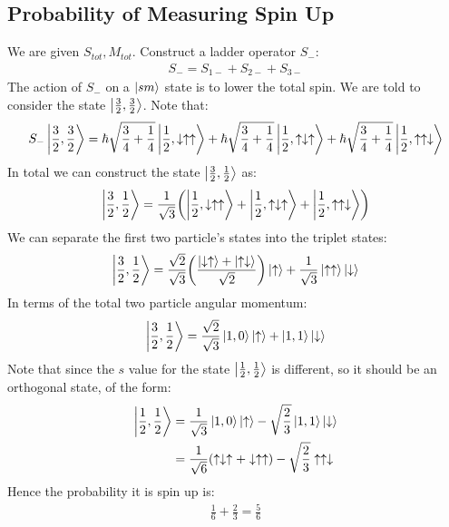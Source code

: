 \documentclass[12pt]{article}
\newcommand{\ua}{\uparrow}
\newcommand{\da}{\downarrow}
\begin{document}
\subsection{Probability of Measuring Spin Up}
We are given $S_{tot},M_{tot}$. Construct a ladder operator $S_-$:
\begin{align*}
  S_-=S_{1-}+S_{2-}+S_{3-}
\end{align*}
The action of $S_-$ on a $\ket{sm}$ state is to lower the total spin. We are told to consider the state $\ket{\frac32,\frac32}$. Note that:
\begin{align*}
  S_{-}\ket{\frac32,\frac32}=
  \hbar\sqrt{\frac34+\frac14}\ket{\frac12,\da\ua\ua}
  +\hbar\sqrt{\frac34+\frac14}\ket{\frac12,\ua\da\ua}
  +\hbar\sqrt{\frac34+\frac14}\ket{\frac12,\ua\ua\da}
\end{align*}
In total we can construct the state $\ket{\frac32,\frac12}$ as:
\begin{align*}
  \ket{\frac32,\frac12}=\frac1{\sqrt{3}}\qty(\ket{\frac12,\da\ua\ua}+
  \ket{\frac12,\ua\da\ua}+\ket{\frac12,\ua\ua\da})
\end{align*}
We can separate the first two particle's states into the triplet states:
\begin{align*}
  \ket{\frac32,\frac12}=\frac{\sqrt{2}}{\sqrt{3}}
  \qty(\frac{\ket{\da\ua}+\ket{\ua\da}}{\sqrt{2}})\ket{\ua}
  +\frac1{\sqrt{3}}\ket{\ua\ua}\ket{\da}
\end{align*}
In terms of the total two particle angular momentum:
\begin{align*}
  \ket{\frac32,\frac12}=\frac{\sqrt{2}}{\sqrt{3}}\ket{1,0}\ket\ua+
  \ket{1,1}\ket{\da}
\end{align*}
Note that since the $s$ value for the state $\ket{\frac12,\frac12}$ is different, so it should be an orthogonal state, of the form:
\begin{align*}
  \ket{\frac12,\frac12}&=\frac1{\sqrt{3}}\ket{1,0}\ket{\ua}-\sqrt{\frac{2}{3}}
  \ket{1,1}\ket{\da}\\
  &=\frac1{\sqrt{6}}\qty(\ua\da\ua+\da\ua\ua)-\sqrt{\frac{2}{3}}\ua\ua\da
\end{align*}
Hence the probability it is spin up is:
\begin{align*}
  \boxed{\frac16+\frac23=\frac56}
\end{align*}
\end{document}
